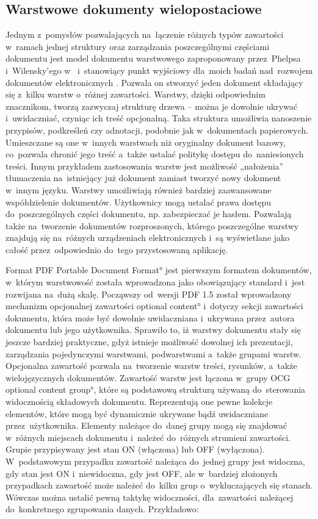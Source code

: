 \subsection{Warstwowe dokumenty wielopostaciowe}
\label{sec:WarstwoweDokumentyWielopostaciowe}
Jednym z~pomysłów pozwalających na~łączenie różnych typów zawartości w~ramach jednej struktury oraz zarządzania poszczególnymi częściami dokumentu jest model dokumentu warstwowego zaproponowany przez~Phelpsa i~Wilensky'ego w~\cite{Phelps96, Phelps98_tech_rep} i~stanowiący punkt wyjściowy dla~moich badań nad~rozwojem dokumentów elektronicznych \cite{KKTI06_moja, TECHNICON06_moja}. Pozwala on stworzyć jeden dokument składający się z~kilku warstw o~różnej zawartości. Warstwy, dzięki odpowiednim znacznikom, tworzą zazwyczaj strukturę drzewa -- można je dowolnie ukrywać i~uwidaczniać, czyniąc ich treść opcjonalną. Taka struktura umożliwia nanoszenie przypisów, podkreśleń czy adnotacji, podobnie jak w~dokumentach papierowych. Umieszczane są one w~innych warstwach niż oryginalny dokument bazowy, co~pozwala chronić jego treść a~także ustalać politykę dostępu do~naniesionych treści. Innym przykładem zastosowania warstw jest możliwość „nałożenia” tłumaczenia na~istniejący już dokument zamiast tworzyć nowy dokument w~innym języku. Warstwy umożliwiają również bardziej zaawansowane współdzielenie dokumentów. Użytkownicy mogą ustalać prawa dostępu do~poszczególnych części dokumentu, np. zabezpieczać je hasłem. Pozwalają także na~tworzenie dokumentów rozproszonych, którego poszczególne warstwy znajdują się na~różnych urządzeniach elektronicznych i~są wyświetlane jako całość przez~odpowiednio do~tego przystosowaną aplikację.

Format PDF \ang{Portable Document Format} jest pierwszym formatem dokumentów, w~którym warstwowość została wprowadzona jako obowiązujący standard i~jest rozwijana na~dużą skalę. Począwszy od~wersji PDF 1.5 \cite{PDFRef} został wprowadzony mechanizm opcjonalnej zawartości \ang{optional content} i~dotyczy sekcji zawartości dokumentu, która może być dowolnie uwidaczniana i~ukrywana przez~autora dokumentu lub jego użytkownika. Sprawiło to, iż warstwy dokumentu stały się jeszcze bardziej praktyczne, gdyż istnieje możliwość dowolnej ich prezentacji, zarządzania pojedynczymi warstwami, podwarstwami a~także grupami warstw. Opcjonalna zawartość pozwala na~tworzenie warstw treści, rysunków, a~także wielojęzycznych dokumentów. Zawartość warstw jest łączona w~grupy OCG \ang{optional content group}, które są podstawową strukturą używaną do~sterowania widocznością składowych dokumentu. Reprezentują one pewne kolekcje elementów, które mogą być dynamicznie ukrywane bądź uwidaczniane przez~użytkownika. Elementy należące do~danej grupy mogą się znajdować w~różnych miejscach dokumentu i~należeć do~różnych strumieni zawartości. Grupie przypisywany jest stan ON (włączona) lub OFF (wyłączona). W~podstawowym przypadku zawartość należąca do~jednej grupy jest widoczna, gdy stan jest ON i~niewidoczna, gdy jest OFF, ale w~bardziej złożonych przypadkach zawartość może należeć do~kilku grup o~wykluczających się stanach. Wówczas można ustalić pewną taktykę widoczności, dla~zawartości należącej do~konkretnego zgrupowania danych. Przykładowo:

